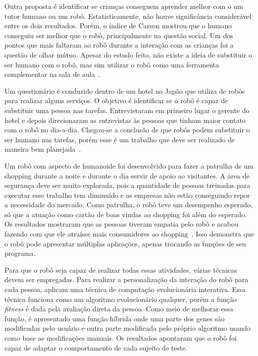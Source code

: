 Outra proposta é identificar se crianças conseguem aprender melhor com o um tutor humano ou um robô. Estatisticamente, não houve significância considerável entre os dois resultados. Porém, o índice de Carson mostrou que o humano conseguiu ser melhor que o robô, principalmente na questão social. Um dos pontos que mais faltaram ao robô durante a interação com as crianças foi a questão de olhar mútuo. Apesar do estudo feito, não existe a ideia de substituir o ser humano com o robô, mas sim utilizar o robô como uma ferramenta complementar na sala de aula~\cite{kennedy:2016}.

Um questionário é conduzido dentro de um hotel no Japão que utiliza de robôs para realizar alguns serviços. O objetivo é identificar se o robô é capaz de substituir uma pessoa nas tarefas. Entrevistaram em primeiro lugar o gerente do hotel e depois direcionaram as entrevistas às pessoas que tinham maior contato com o robô no dia-a-dia. Chegou-se a conclusão de que robôs podem substituir o ser humano nas tarefas, porém esse é um trabalho que deve ser realizado de maneira bem planejada~\cite{osawa:2017}.

Um robô com aspecto de humanoide foi desenvolvido para fazer a patrulha de um shopping durante a noite e durante o dia servir de apoio ao visitantes. A área de segurança deve ser muito explorada, pois a quantidade de pessoas treinadas para executar esse trabalho tem diminuído e as empresas não estão conseguindo repor a necessidade do mercado. Como patrulha, o robô teve um desempenho esperado, só que a atuação como cartão de boas vindas ao shopping foi além do esperado. Os resultados mostraram que as pessoas tiveram empatia pelo robô e acabou fazendo com que ele atraísse mais consumidores ao shopping~\cite{lopez:2017}. Isso demonstra que o robô pode apresentar múltiplas aplicações, apenas trocando as funções de seu programa.

Para que o robô seja capaz de realizar todas essas atividades, várias técnicas devem ser empregadas. Para realizar a personalização da interação do robô para cada pessoa,  aplicam uma técnica de computação evolucionária interativa. Essa técnica funciona como um algoritmo evolucionário qualquer, porém a função \emph{fitness} é dada pela avaliação direta da pessoa. Como meio de melhorar essa função, é apresentado uma função híbrida onde uma parte dos genes são modificadas pelo usuário e outra parte modificada pelo próprio algoritmo usando como base as modificações manuais. Os resultados apontaram que o robô foi capaz de adaptar o comportamento de cada sujeito de teste.

